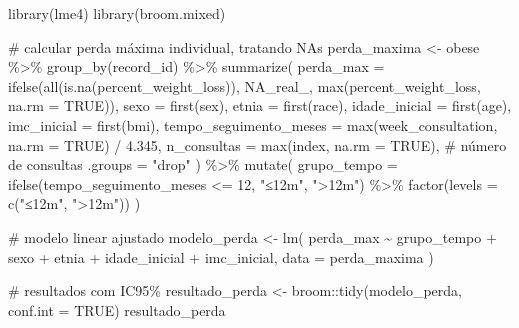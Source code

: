 \documentclass[
]{article}
\newenvironment{Shaded}{\begin{snugshade}}{\end{snugshade}}
\newcommand{\AttributeTok}[1]{\textcolor[rgb]{0.40,0.45,0.13}{#1}}
\newcommand{\CommentTok}[1]{\textcolor[rgb]{0.37,0.37,0.37}{#1}}
\newcommand{\ConstantTok}[1]{\textcolor[rgb]{0.56,0.35,0.01}{#1}}
\newcommand{\DecValTok}[1]{\textcolor[rgb]{0.68,0.00,0.00}{#1}}
\newcommand{\FloatTok}[1]{\textcolor[rgb]{0.68,0.00,0.00}{#1}}
\newcommand{\FunctionTok}[1]{\textcolor[rgb]{0.28,0.35,0.67}{#1}}
\newcommand{\NormalTok}[1]{\textcolor[rgb]{0.00,0.23,0.31}{#1}}
\newcommand{\OtherTok}[1]{\textcolor[rgb]{0.00,0.23,0.31}{#1}}
\newcommand{\SpecialCharTok}[1]{\textcolor[rgb]{0.37,0.37,0.37}{#1}}
\newcommand{\StringTok}[1]{\textcolor[rgb]{0.13,0.47,0.30}{#1}}
\begin{document}
\begin{Shaded}
\begin{Highlighting}[]
\FunctionTok{library}\NormalTok{(lme4)}
\FunctionTok{library}\NormalTok{(broom.mixed)}

\CommentTok{\# calcular perda máxima individual, tratando NAs}
\NormalTok{perda\_maxima }\OtherTok{\textless{}{-}}\NormalTok{ obese }\SpecialCharTok{\%\textgreater{}\%}
  \FunctionTok{group\_by}\NormalTok{(record\_id) }\SpecialCharTok{\%\textgreater{}\%}
  \FunctionTok{summarize}\NormalTok{(}
    \AttributeTok{perda\_max =} \FunctionTok{ifelse}\NormalTok{(}\FunctionTok{all}\NormalTok{(}\FunctionTok{is.na}\NormalTok{(percent\_weight\_loss)), }
                       \ConstantTok{NA\_real\_}\NormalTok{, }
                       \FunctionTok{max}\NormalTok{(percent\_weight\_loss, }\AttributeTok{na.rm =} \ConstantTok{TRUE}\NormalTok{)),}
    \AttributeTok{sexo =} \FunctionTok{first}\NormalTok{(sex),}
    \AttributeTok{etnia =} \FunctionTok{first}\NormalTok{(race),}
    \AttributeTok{idade\_inicial =} \FunctionTok{first}\NormalTok{(age),}
    \AttributeTok{imc\_inicial =} \FunctionTok{first}\NormalTok{(bmi),}
    \AttributeTok{tempo\_seguimento\_meses =} \FunctionTok{max}\NormalTok{(week\_consultation, }\AttributeTok{na.rm =} \ConstantTok{TRUE}\NormalTok{) }\SpecialCharTok{/} \FloatTok{4.345}\NormalTok{,}
    \AttributeTok{n\_consultas =} \FunctionTok{max}\NormalTok{(index, }\AttributeTok{na.rm =} \ConstantTok{TRUE}\NormalTok{),  }\CommentTok{\# número de consultas}
    \AttributeTok{.groups =} \StringTok{"drop"}
\NormalTok{  ) }\SpecialCharTok{\%\textgreater{}\%}
  \FunctionTok{mutate}\NormalTok{(}
    \AttributeTok{grupo\_tempo =} \FunctionTok{ifelse}\NormalTok{(tempo\_seguimento\_meses }\SpecialCharTok{\textless{}=} \DecValTok{12}\NormalTok{, }\StringTok{"≤12m"}\NormalTok{, }\StringTok{"\textgreater{}12m"}\NormalTok{) }\SpecialCharTok{\%\textgreater{}\%} 
      \FunctionTok{factor}\NormalTok{(}\AttributeTok{levels =} \FunctionTok{c}\NormalTok{(}\StringTok{"≤12m"}\NormalTok{, }\StringTok{"\textgreater{}12m"}\NormalTok{))}
\NormalTok{  )}

\CommentTok{\# modelo linear ajustado}
\NormalTok{modelo\_perda }\OtherTok{\textless{}{-}} \FunctionTok{lm}\NormalTok{(}
\NormalTok{  perda\_max }\SpecialCharTok{\textasciitilde{}}\NormalTok{ grupo\_tempo }\SpecialCharTok{+}\NormalTok{ sexo }\SpecialCharTok{+}\NormalTok{ etnia }\SpecialCharTok{+}\NormalTok{ idade\_inicial }\SpecialCharTok{+}\NormalTok{ imc\_inicial,}
  \AttributeTok{data =}\NormalTok{ perda\_maxima}
\NormalTok{)}

\CommentTok{\# resultados com IC95\%}
\NormalTok{resultado\_perda }\OtherTok{\textless{}{-}}\NormalTok{ broom}\SpecialCharTok{::}\FunctionTok{tidy}\NormalTok{(modelo\_perda, }\AttributeTok{conf.int =} \ConstantTok{TRUE}\NormalTok{)}
\NormalTok{resultado\_perda}
\end{Highlighting}
\end{Shaded}
\end{document}
